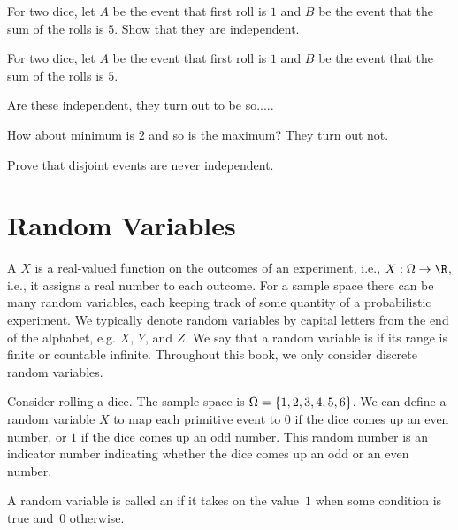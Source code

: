{\begin{example}
\end{example}

\begin{simpleexample}

For two dice, let $A$ be the event that first roll is $1$ and $B$ be
the event that the sum of the rolls is $5$.
Show that they are independent.
\end{simpleexample}


\begin{simpleexample}
For two dice, let $A$ be the event that first roll is $1$ and $B$ be
the event that the sum of the rolls is $5$.

  Are these independent,
they turn out to be so.....

How about minimum is $2$ and so is the maximum?  They turn out not.

\end{simpleexample}

\begin{simpleexample}
Prove that disjoint events are never independent.
\end{simpleexample}

\section{Random Variables} 
A  $X$ is a real-valued function on the outcomes
of an experiment, i.e., $X : \SSpace \to \R$, i.e., it assigns a real
number to each outcome.
%
For a sample space there can be many random variables, each keeping
track of some quantity of a probabilistic experiment.
%
We typically denote random variables by capital letters from
the end of the alphabet, e.g. $X$, $Y$, and $Z$.
%
We say that a random variable is  if its range is
finite or countable infinite.  Throughout this book, we only consider
discrete random variables. 

\begin{example}
Consider rolling a dice.  The sample space is $\Omega = \{1, 2, 3, 4,
5, 6 \}$.
%
We can define a random variable $X$ to map each primitive event to $0$
if the dice comes up an even number, or $1$ if the dice comes up an
odd number.
%
This random number is an indicator number indicating whether the dice
comes up an odd or an even number.
\end{example}

A random variable is called an  if it
takes on the value~$1$ when some condition is true and~$0$
otherwise.
%

}
